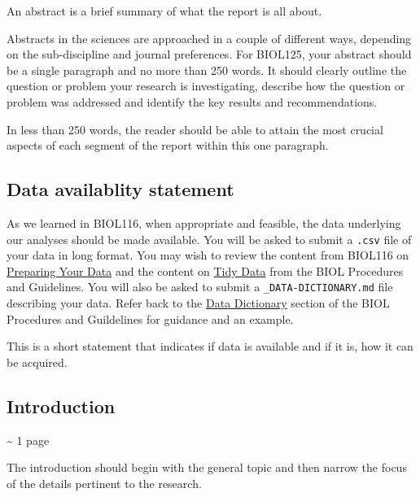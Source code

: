 \documentclass[
]{book}
\begin{document}
An abstract is a brief summary of what the report is all about.

Abstracts in the sciences are approached in a couple of different ways, depending on the sub-discipline and journal preferences. For BIOL125, your abstract should be a single paragraph and no more than 250 words. It should clearly outline the question or problem your research is investigating, describe how the question or problem was addressed and identify the key results and recommendations.

In less than 250 words, the reader should be able to attain the most crucial aspects of each segment of the report within this one paragraph.

\hypertarget{data-availablity-statement}{%
\subsection*{Data availablity statement}\label{data-availablity-statement}}

As we learned in BIOL116, when appropriate and feasible, the data underlying our analyses should be made available. You will be asked to submit a \texttt{.csv} file of your data in long format. You may wish to review the content from BIOL116 on \href{https://ubco-biology.github.io/BIOL-116-Lab-Manual/preparing-your-data.html}{Preparing Your Data} and the content on \href{https://ubco-biology.github.io/Procedures-and-Guidelines/tidy-data.html}{Tidy Data} from the BIOL Procedures and Guidelines. You will also be asked to submit a \texttt{\_DATA-DICTIONARY.md} file describing your data. Refer back to the \href{https://ubco-biology.github.io/Procedures-and-Guidelines/data-dictionary.html}{Data Dictionary} section of the BIOL Procedures and Guildelines for guidance and an example.

This is a short statement that indicates if data is available and if it is, how it can be acquired.

\hypertarget{introduction}{%
\subsection*{Introduction}\label{introduction}}

\textasciitilde{} 1 page

The introduction should begin with the general topic and then narrow the focus of the details pertinent to the research.
\end{document}
